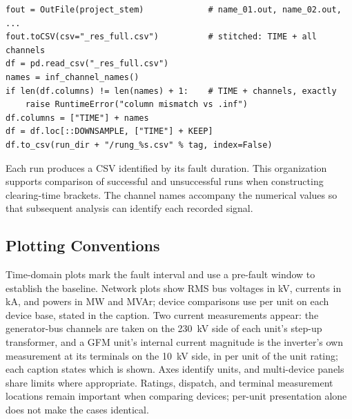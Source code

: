 \documentclass[11pt]{article}
\begin{document}
\begin{lstlisting}
fout = OutFile(project_stem)             # name_01.out, name_02.out, ...
fout.toCSV(csv="_res_full.csv")          # stitched: TIME + all channels
df = pd.read_csv("_res_full.csv")
names = inf_channel_names()
if len(df.columns) != len(names) + 1:    # TIME + channels, exactly
    raise RuntimeError("column mismatch vs .inf")
df.columns = ["TIME"] + names
df = df.loc[::DOWNSAMPLE, ["TIME"] + KEEP]
df.to_csv(run_dir + "/rung_%s.csv" % tag, index=False)
\end{lstlisting}

Each run produces a CSV identified by its fault duration. This organization supports comparison of successful and unsuccessful runs when constructing clearing-time brackets. The channel names accompany the numerical values so that subsequent analysis can identify each recorded signal.

\subsection{Plotting Conventions}
Time-domain plots mark the fault interval and use a pre-fault window to establish the baseline. Network plots show RMS bus voltages in kV, currents in kA, and powers in MW and MVAr; device comparisons use per unit on each device base, stated in the caption. Two current measurements appear: the generator-bus channels are taken on the 230~kV side of each unit's step-up transformer, and a GFM unit's internal current magnitude is the inverter's own measurement at its terminals on the 10~kV side, in per unit of the unit rating; each caption states which is shown. Axes identify units, and multi-device panels share limits where appropriate. Ratings, dispatch, and terminal measurement locations remain important when comparing devices; per-unit presentation alone does not make the cases identical.
\end{document}
